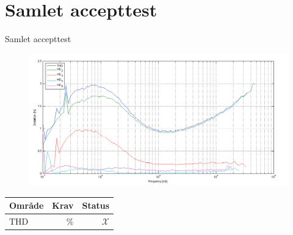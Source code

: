 \section{Samlet accepttest}

\begin{frame}{Samlet accepttest}
\begin{figure}[h]
\centering
\includegraphics[width=\textwidth]{images/final_mic_3,16mv_thd.png}
\end{figure}
\scriptsize{\begin{table}[h]
\centering
\begin{tabular}{l|r|r}
\hline\hline
Område & Krav & Status \\
\hline\hline
THD & \< 1 \% & $\mathcal{X}$ \\
\hline\hline
\end{tabular}
\end{table}}

\end{frame}

